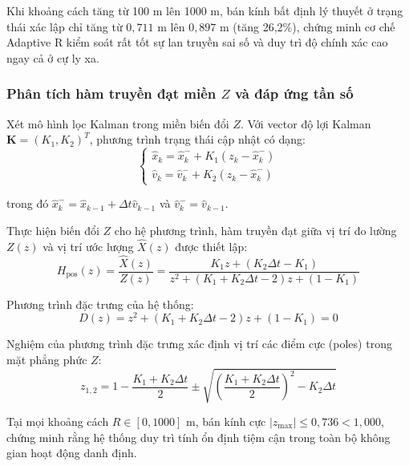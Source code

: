 Khi khoảng cách tăng từ 100 m lên 1000 m, bán kính bất định lý thuyết ở trạng thái xác lập chỉ tăng từ $0{,}711$ m lên $0{,}897$ m (tăng 26,2\%), chứng minh cơ chế Adaptive R kiểm soát rất tốt sự lan truyền sai số và duy trì độ chính xác cao ngay cả ở cự ly xa.

\subsubsection{Phân tích hàm truyền đạt miền \texorpdfstring{$Z$}{Z} và đáp ứng tần số}

\hspace{0.5cm} Xét mô hình lọc Kalman trong miền biến đổi $Z$. Với vector độ lợi Kalman $\mathbf{K} = (K_1, K_2)^T$, phương trình trạng thái cập nhật có dạng:
\begin{equation}
\begin{cases}
\hat{x}_k = \hat{x}_k^- + K_1 (z_k - \hat{x}_k^-) \\
\hat{v}_k = \hat{v}_k^- + K_2 (z_k - \hat{x}_k^-)
\end{cases}
\label{eq:state-update-scalar}
\end{equation}

trong đó $\hat{x}_k^- = \hat{x}_{k-1} + \Delta t \hat{v}_{k-1}$ và $\hat{v}_k^- = \hat{v}_{k-1}$.

Thực hiện biến đổi $Z$ cho hệ phương trình, hàm truyền đạt giữa vị trí đo lường $Z(z)$ và vị trí ước lượng $\hat{X}(z)$ được thiết lập:
\begin{equation}
H_{\text{pos}}(z) = \frac{\hat{X}(z)}{Z(z)} = \frac{K_1 z + (K_2 \Delta t - K_1)}{z^2 + (K_1 + K_2 \Delta t - 2) z + (1 - K_1)}
\label{eq:z-transfer-function}
\end{equation}

Phương trình đặc trưng của hệ thống:
\begin{equation}
D(z) = z^2 + (K_1 + K_2 \Delta t - 2) z + (1 - K_1) = 0
\label{eq:characteristic-equation}
\end{equation}

Nghiệm của phương trình đặc trưng xác định vị trí các điểm cực (poles) trong mặt phẳng phức $Z$:
\begin{equation}
z_{1,2} = 1 - \frac{K_1 + K_2 \Delta t}{2} \pm \sqrt{\left(\frac{K_1 + K_2 \Delta t}{2}\right)^2 - K_2 \Delta t}
\label{eq:z-poles}
\end{equation}

Tại mọi khoảng cách $R \in [0, 1000]$ m, bán kính cực $|z_{\max}| \le 0{,}736 < 1{,}000$, chứng minh rằng hệ thống duy trì tính ổn định tiệm cận trong toàn bộ không gian hoạt động danh định.

